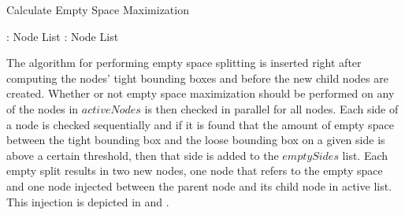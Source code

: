 \begin{algorithm}
  \caption{Calculate Empty Space Maximization}
  \label{alg:emptySpaceMaximizing}
  \begin{algorithmic}
               { : Node List}
               { : Node List}{


                 \STATE{}
                     \ENDIF
                   \ENDFOR
                 \ENDFOR
                 \ENDFOR
                 \ENDIF

                 \STATE{}

  }
  \end{algorithmic}
\end{algorithm}


The algorithm for performing empty space splitting is inserted right after
computing the nodes' tight bounding boxes and before the new child nodes are
created. Whether or not empty space maximization should be performed on any of
the nodes in $activeNodes$ is then checked in parallel for all nodes. Each side
of a node is checked sequentially and if it is found that the amount of empty
space between the tight bounding box and the loose bounding box on a given side
is above a certain threshold, then that side is added to the $emptySides$
list. Each empty split results in two new nodes, one node that refers to the
empty space and one node injected between the parent node and its child node in
active list. This injection is depicted in  and
.

